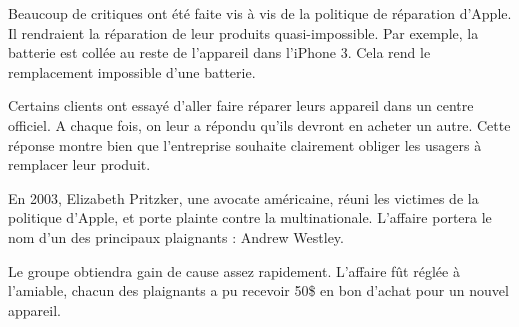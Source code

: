 \smallskip
Beaucoup de critiques ont été faite vis à vis de la politique de réparation d'Apple. Il rendraient la réparation de leur produits quasi-impossible. Par exemple, la batterie est collée au reste de l'appareil dans l'iPhone 3. Cela rend le remplacement impossible d'une batterie. 

Certains clients ont essayé d'aller faire réparer leurs appareil dans un centre officiel. A chaque fois, on leur a répondu qu'ils devront en acheter un autre. Cette réponse montre bien que l'entreprise souhaite clairement obliger les usagers à remplacer leur produit. 
\smallskip


En 2003, Elizabeth Pritzker, une avocate américaine, réuni les victimes de la politique d'Apple, et porte plainte contre la multinationale. L'affaire portera le nom d'un des principaux plaignants : Andrew Westley. 

Le groupe obtiendra gain de cause assez rapidement. L'affaire fût réglée à l'amiable, chacun des plaignants a pu recevoir 50\$ en bon d'achat pour un nouvel appareil. 